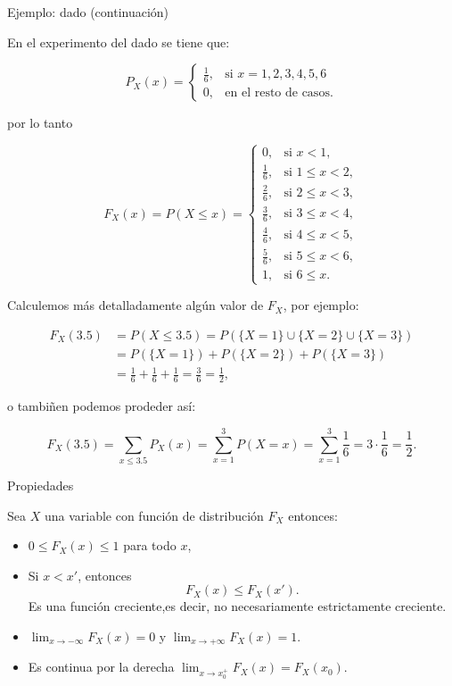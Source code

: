 \documentclass[
  letterpaper,
  DIV=11,
  numbers=noendperiod]{scrreprt}
\providecommand{\tightlist}{%
  \setlength{\itemsep}{0pt}\setlength{\parskip}{0pt}}\usepackage{longtable,booktabs,array}
\begin{document}
\begin{Ejemplo}{Ejemplo: dado (continuación)}{}

En el experimento del dado se tiene que:

\[P_{X}(x)=\left\{\begin{array}{ll} \frac16, & \mbox{si } x=1,2,3,4,5,6\\ 0, & \mbox{en el resto de casos.}\end{array}\right.\]

por lo tanto

\[
F_{X}(x)=P(X\leq x)=
\left\{
    \begin{array}{ll}
   0, & \mbox{si } x<1,\\
   \frac16, &\mbox{si } 1\leq x<2,\\[1ex]
   \frac26, &\mbox{si } 2\leq x<3,\\
   \frac36, &\mbox{si } 3\leq x<4,\\
   \frac46, &\mbox{si } 4\leq x<5,\\
   \frac56, &\mbox{si } 5\leq x<6,\\
   1, &\mbox{si } 6\leq x.\end{array}
\right.
\]

Calculemos más detalladamente algún valor de \(F_{X}\), por ejemplo:

\begin{align*}
F_{X}(3.5) & =  P(X\leq 3.5)=  P(\{X=1\}\cup\{X=2\}\cup \{X=3\})\\
&= P(\{X=1\})+P(\{X=2\})+P(\{X=3\})\\
&= \frac16+\frac16+\frac16=\frac36 =\frac12,
\end{align*}

o tambiñen podemos prodeder así:

\[F_{X}(3.5)=\sum_{x\leq 3.5} P_X(x)=\sum_{x=1}^3 P(X=x)=\sum_{x=1}^3 \frac16= 3 \cdot
   \frac16=\frac12.
\]

\end{Ejemplo}

\begin{Proposicion}{Propiedades}{}

Sea \(X\) una variable con función de distribución \(F_{X}\) entonces:

\begin{itemize}
\tightlist
\item
  \(0\leq F_{X}(x)\leq 1\) para todo \(x\),
\item
  Si \(x<x'\), entonces \[F_{X}(x)\leq F_{X}(x').\] Es una función
  creciente,es decir, no necesariamente estrictamente creciente.
\item
  \(\displaystyle \lim_{x\to -\infty}F_{X}(x)=0\) y
  \(\displaystyle \lim_{x\to +\infty}F_{X}(x)=1.\)
\item
  Es continua por la derecha
  \(\displaystyle \lim_{x\to x_0^{+}}F_{X}(x)=F_{X}(x_0)\).
\end{itemize}

\end{Proposicion}
\end{document}
